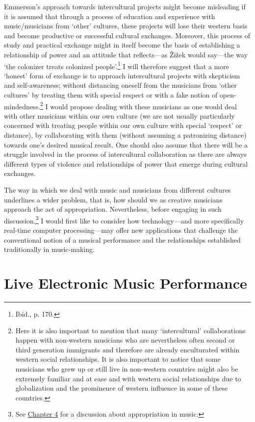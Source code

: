 Emmerson's approach towards intercultural projects might become misleading if it is assumed that through a process of education and experience with music/musicians from `other' cultures, these projects will lose their western basis and become productive or successful cultural exchanges. Moreover, this process of study and practical exchange might in itself become the basis of establishing a relationship of power and an attitude that reflects---as \v{Z}i\v{z}ek would say---the way `the colonizer treats colonized people'.\footnote{Ibid., p. 170.} I will therefore suggest that a more `honest' form of exchange is to approach intercultural projects with skepticism and self-awareness; without distancing oneself from the musicians from `other cultures' by treating them with special respect or with a fake notion of open-mindedness.\footnote{Here it is also important to mention that many `intercultural' collaborations happen with non-western musicians who are nevertheless often second or third generation immigrants and therefore are already enculturated within western social relationships. It is also important to notice that some musicians who grew up or still live in non-western countries might also be extremely familiar and at ease and with western social relationships due to globalization and the prominence of western influence in some of these countries.} I would propose dealing with these musicians as one would deal with other musicians within our own culture (we are not usually particularly concerned with treating people within our own culture with special `respect' or distance), by collaborating with them (without assuming a patronizing distance) towards one's desired musical result. One should also assume that there will be a struggle involved in the process of intercultural collaboration as there are always different types of violence and relationships of power that emerge during cultural exchanges. 

The way in which we deal with music and musicians from different cultures underlines a wider problem, that is, how should we as creative musicians approach the act of appropriation. Nevertheless, before engaging in such discussion,\footnote{See \hyperlink{chapter4}{Chapter 4} for a discussion about appropriation in music.} I would first like to consider how technology---and more specifically real-time computer processing---may offer new applications that challenge the conventional notion of a musical performance and the relationships established traditionally in music-making.

\section{Live Electronic Music Performance}


